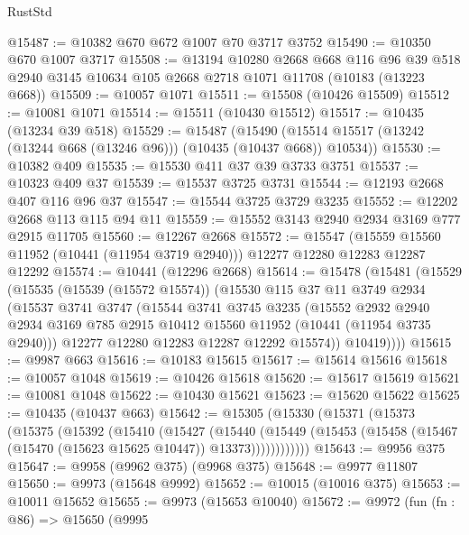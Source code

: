 \begin{lexlean}{RustStd}
\begin{coremodule}
@15487 := @10382 @670 @672 @1007 @70 @3717 @3752
@15490 := @10350 @670 @1007 @3717
@15508 := @13194
    @10280
    @2668
    @668
    @116
    @96
    @39
    @518
    @2940
    @3145
    @10634
    @105
    @2668
    @2718
    @1071
    @11708
    (@10183 (@13223 @668))
@15509 := @10057 @1071
@15511 := @15508 (@10426 @15509)
@15512 := @10081 @1071
@15514 := @15511 (@10430 @15512)
@15517 := @10435 (@13234 @39 @518)
@15529 := @15487
    (@15490 (@15514 @15517 (@13242 (@13244 @668 (@13246 @96))) (@10435 (@10437 @668)) @10534))
@15530 := @10382 @409
@15535 := @15530 @411 @37 @39 @3733 @3751
@15537 := @10323 @409 @37
@15539 := @15537 @3725 @3731
@15544 := @12193 @2668 @407 @116 @96 @37
@15547 := @15544 @3725 @3729 @3235
@15552 := @12202 @2668 @113 @115 @94 @11
@15559 := @15552 @3143 @2940 @2934 @3169 @777 @2915 @11705
@15560 := @12267 @2668
@15572 := @15547
    (@15559 @15560 @11952 (@10441 (@11954 @3719 @2940)))
    @12277
    @12280
    @12283
    @12287
    @12292
@15574 := @10441 (@12296 @2668)
@15614 := @15478
    (@15481
      (@15529
        (@15535
          (@15539 (@15572 @15574))
          (@15530
            @115
            @37
            @11
            @3749
            @2934
            (@15537
              @3741
              @3747
              (@15544
                @3741
                @3745
                @3235
                (@15552
                  @2932
                  @2940
                  @2934
                  @3169
                  @785
                  @2915
                  @10412
                  @15560
                  @11952
                  (@10441 (@11954 @3735 @2940)))
                @12277
                @12280
                @12283
                @12287
                @12292
                @15574))
            @10419))))
@15615 := @9987 @663
@15616 := @10183 @15615
@15617 := @15614 @15616
@15618 := @10057 @1048
@15619 := @10426 @15618
@15620 := @15617 @15619
@15621 := @10081 @1048
@15622 := @10430 @15621
@15623 := @15620 @15622
@15625 := @10435 (@10437 @663)
@15642 := @15305
    (@15330
      (@15371
        (@15373
          (@15375
            (@15392
              (@15410
                (@15427
                  (@15440
                    (@15449
                      (@15453 (@15458 (@15467 (@15470 (@15623 @15625 @10447)) @13373))))))))))))
@15643 := @9956 @375
@15647 := @9958 (@9962 @375) (@9968 @375)
@15648 := @9977 @11807
@15650 := @9973 (@15648 @9992)
@15652 := @10015 (@10016 @375)
@15653 := @10011 @15652
@15655 := @9973 (@15653 @10040)
@15672 := @9972
    (fun (fn : @86) =>
    @15650
      (@9995

\end{coremodule}
\end{lexlean}
